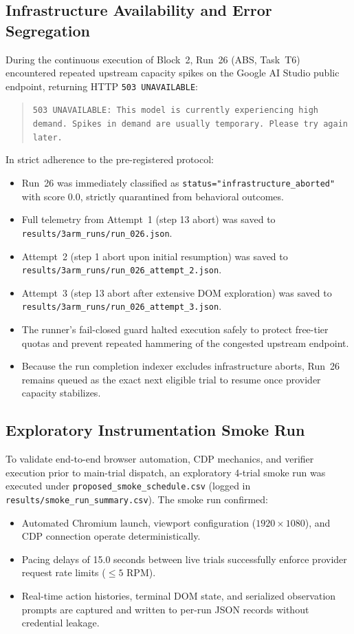 \documentclass[11pt,a4paper]{article}
\begin{document}
\subsection{Infrastructure Availability and Error Segregation}
During the continuous execution of Block~2, Run~26 (\textsc{ABS}, Task~T6) encountered repeated upstream capacity spikes on the Google AI Studio public endpoint, returning HTTP \texttt{503 UNAVAILABLE}:
\begin{quote}
\texttt{503 UNAVAILABLE: This model is currently experiencing high demand. Spikes in demand are usually temporary. Please try again later.}
\end{quote}
In strict adherence to the pre-registered protocol:
\begin{itemize}
    \item Run~26 was immediately classified as \texttt{status="infrastructure\_aborted"} with score $0.0$, strictly quarantined from behavioral outcomes.
    \item Full telemetry from Attempt~1 (step 13 abort) was saved to \texttt{results/3arm\_runs/run\_026.json}.
    \item Attempt~2 (step 1 abort upon initial resumption) was saved to \texttt{results/3arm\_runs/run\_026\_attempt\_2.json}.
    \item Attempt~3 (step 13 abort after extensive DOM exploration) was saved to \texttt{results/3arm\_runs/run\_026\_attempt\_3.json}.
    \item The runner's fail-closed guard halted execution safely to protect free-tier quotas and prevent repeated hammering of the congested upstream endpoint.
    \item Because the run completion indexer excludes infrastructure aborts, Run~26 remains queued as the exact next eligible trial to resume once provider capacity stabilizes.
\end{itemize}

\subsection{Exploratory Instrumentation Smoke Run}
To validate end-to-end browser automation, CDP mechanics, and verifier execution prior to main-trial dispatch, an exploratory 4-trial smoke run was executed under \texttt{proposed\_smoke\_schedule.csv} (logged in \texttt{results/smoke\_run\_summary.csv}). The smoke run confirmed:
\begin{itemize}
    \item Automated Chromium launch, viewport configuration ($1920 \times 1080$), and CDP connection operate deterministically.
    \item Pacing delays of 15.0 seconds between live trials successfully enforce provider request rate limits ($\le 5$ RPM).
    \item Real-time action histories, terminal DOM state, and serialized observation prompts are captured and written to per-run JSON records without credential leakage.
\end{itemize}
\end{document}
